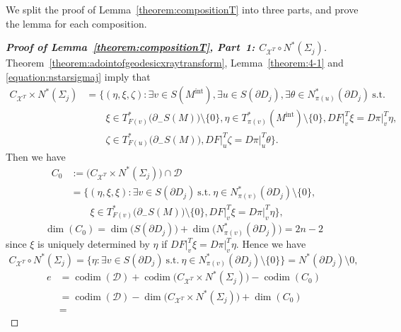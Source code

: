 \documentclass[a4paper,11pt,reqno]{amsart}
\numberwithin{equation}{section}
\theoremstyle{definition}
\theoremstyle{remark}
\begin{document}
%
% 
We split the proof of Lemma~\ref{theorem:compositionT} 
into three parts, and prove the lemma for each composition. 
%
%
\begin{proof}[{\bf Proof of Lemma~\ref{theorem:compositionT}, Part~1: $C_{\mathcal{X}^T}{\circ}N^\ast(\Sigma_j)$}] 
Theorem~\ref{theorem:adointofgeodesicxraytransform}, 
Lemma~\ref{theorem:4-1} 
and 
\eqref{equation:nstarsigmaj} 
imply that  
%
%
\begin{align*}
  C_{\mathcal{X}^T}{\times}N^\ast(\Sigma_j)
& =
  \bigl\{
  (\eta,\xi,\zeta): 
  \exists v \in S(M^\text{int}), 
  \exists u \in S(\partial{D_j}), 
  \exists \theta \in N^\ast_{\pi(u)}(\partial{D_j})
  \ \text{s.t.}
\\
& \qquad
  \xi \in T^\ast_{F(v)}\bigl(\partial_-S(M)\bigr)\setminus\{0\}, 
  \eta \in T^\ast_{\pi(v)}(M^\text{int})\setminus\{0\}, 
  DF\vert^T_v\xi=D\pi\vert^T_v\eta,
\\
& \qquad
  \zeta \in T^\ast_{F(u)}\bigl(\partial_-S(M)\bigr), 
  DF\vert^T_u\zeta=D\pi\vert^T_u\theta 
  \bigr\}. 
\end{align*}
%
% 
Then we have 
%
% 
\begin{align*}
  C_0
& :=
  \bigl(C_{\mathcal{X}^T}{\times}N^\ast(\Sigma_j)\bigr)\cap\mathcal{D}
\\
& =
  \bigl\{
  (\eta,\xi,\xi): 
  \exists v \in S(\partial{D_j})  
  \ \text{s.t.}\ 
  \eta \in N^\ast_{\pi(v)}(\partial{D_j})\setminus\{0\},
\\
& \qquad
  \xi \in T^\ast_{F(v)}\bigl(\partial_-S(M)\bigr)\setminus\{0\}, 
  DF\vert^T_v\xi=D\pi\vert^T_v\eta
  \bigr\},   
\end{align*}
%
%
$$
\operatorname{dim}(C_0)
=
\operatorname{dim}\bigl(S(\partial{D_j})\bigr)
+
\operatorname{dim}\bigl(N^\ast_{\pi(v)}(\partial{D_j})\bigr)
=
2n-2
$$
%
%
since $\xi$ is uniquely determined by $\eta$ 
if $DF\vert^T_v\xi=D\pi\vert^T_v\eta$. 
Hence we have 
%
%
$$
C_{\mathcal{X}^T}{\circ}N^\ast(\Sigma_j)
=
\{\eta: \exists v \in S(\partial{D_j})  
  \ \text{s.t.}\ 
  \eta \in N^\ast_{\pi(v)}(\partial{D_j})\setminus\{0\}\}
=
N^\ast(\partial{D_j})\setminus0,    
$$
%
%
\begin{align*}
  e
& =
  \operatorname{codim}(\mathcal{D})
  +
  \operatorname{codim}
  \bigl(C_{\mathcal{X}^T}{\times}N^\ast(\Sigma_j)\bigr)
  -
  \operatorname{codim}(C_0)
\\
& =
  \operatorname{codim}(\mathcal{D})
  -
  \operatorname{dim}
  \bigl(C_{\mathcal{X}^T}{\times}N^\ast(\Sigma_j)\bigr)
  +
  \operatorname{dim}(C_0) 
\\
& =

\end{align*}
\end{proof}
\end{document}

